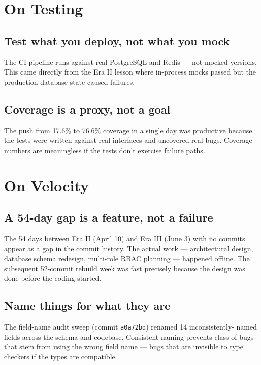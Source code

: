 \documentclass[11pt,a4paper,twoside]{book}
\begin{document}
\section{On Testing}

\subsection{Test what you deploy, not what you mock}
The CI pipeline runs against real PostgreSQL and Redis — not mocked versions.
This came directly from the Era II lesson where in-process mocks passed but
the production database state caused failures.

\subsection{Coverage is a proxy, not a goal}
The push from 17.6\% to 76.6\% coverage in a single day was productive because
the tests were written against real interfaces and uncovered real bugs.
Coverage numbers are meaningless if the tests don't exercise failure paths.

\section{On Velocity}

\subsection{A 54-day gap is a feature, not a failure}
The 54 days between Era II (April 10) and Era III (June 3) with no commits
appear as a gap in the commit history.  The actual work — architectural design,
database schema redesign, multi-role RBAC planning — happened offline.  The
subsequent 52-commit rebuild week was fast precisely because the design was done
before the coding started.

\subsection{Name things for what they are}
The field-name audit sweep (commit \texttt{a0a72bd}) renamed 14 inconsistently-
named fields across the schema and codebase.  Consistent naming prevents class
of bugs that stem from using the wrong field name — bugs that are invisible to
type checkers if the types are compatible.

\end{document}
